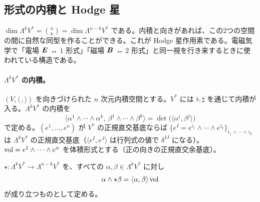 \subsection{形式の内積と Hodge 星}\label{B:ss:star}

$\dim\Lambda^kV^*=\binom nk=\dim\Lambda^{n-k}V^*$ である。内積と向きがあれば、この2つの空間の間に自然な同型を作ることができる。これが Hodge 星作用素である。電磁気学で「電場 $\boldsymbol E$ ↔ $1$ 形式」「磁場 $\boldsymbol B$ ↔ $2$ 形式」と同一視を行き来するときに使われている構造である。

\paragraph{$\Lambda^kV^*$ の内積。}$(V,\langle\,,\rangle)$ を向きづけられた $n$ 次元内積空間とする。$V^*$ には $\flat,\sharp$ を通じて内積が入る。$\Lambda^kV^*$ の内積を
\[
\langle\alpha^1\wedge\cdots\wedge\alpha^k,\ \beta^1\wedge\cdots\wedge\beta^k\rangle=\det\bigl(\langle\alpha^i,\beta^j\rangle\bigr)
\]
で定める。$(e^1,\dots,e^n)$ が $V^*$ の正規直交基底ならば $\{e^I=e^{i_1}\wedge\cdots\wedge e^{i_k}\}_{i_1<\cdots<i_k}$ は $\Lambda^kV^*$ の正規直交基底（$\langle e^I,e^J\rangle$ は行列式の値で $\delta^{IJ}$ になる）。$\mathrm{vol}=e^1\wedge\cdots\wedge e^n$ を体積形式とする（正の向きの正規直交余基底）。

\begin{defn}[Hodge 星]\label{B:def:star}
$\star:\Lambda^kV^*\to\Lambda^{n-k}V^*$ を、すべての $\alpha,\beta\in\Lambda^kV^*$ に対し
\[
\alpha\wedge\star\beta=\langle\alpha,\beta\rangle\,\mathrm{vol}
\]
が成り立つものとして定める。
\end{defn}

